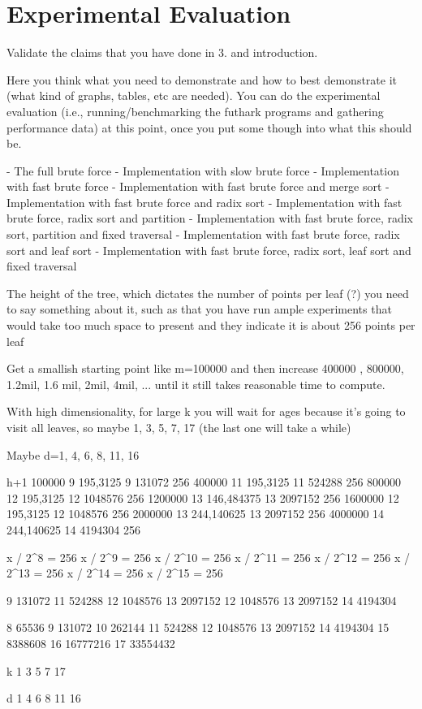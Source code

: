 \section{Experimental Evaluation}
\label{sec:eval}
Validate the claims that you have done in 3. and introduction.

Here you think what you need to demonstrate and how to best demonstrate it
(what kind of graphs, tables, etc are needed). You can do the experimental evaluation
(i.e., running/benchmarking the futhark programs and gathering performance data)
at this point, once you put some though into what this should be.


- The full brute force
- Implementation with slow brute force
- Implementation with fast brute force
- Implementation with fast brute force and merge sort
- Implementation with fast brute force and radix sort
- Implementation with fast brute force, radix sort and partition
- Implementation with fast brute force, radix sort, partition and fixed traversal
- Implementation with fast brute force, radix sort and leaf sort
- Implementation with fast brute force, radix sort, leaf sort and fixed traversal


The height of the tree, which dictates the number of points per leaf (?)  you need to say something about it, such as that you have run ample experiments that would take too much space to present and they indicate it is about 256 points per leaf


Get a smallish starting point like m=100000 and then increase 400000 , 800000, 1.2mil, 1.6 mil, 2mil, 4mil, ... until it still takes reasonable time to compute.

With high dimensionality, for large k you will wait for ages because it’s going to visit all leaves, so maybe 1, 3, 5, 7, 17 (the last one will take a while)

Maybe d=1, 4, 6, 8, 11, 16

			h+1
100000 		9		195,3125		9	131072		256
400000 		11		195,3125		11	524288		256
800000 		12		195,3125		12	1048576		256
1200000		13		146,484375		13	2097152		256
1600000		12		195,3125		12	1048576		256
2000000		13		244,140625		13	2097152		256
4000000		14		244,140625		14	4194304		256

x / 2^8 = 256
x / 2^9 = 256
x / 2^10 = 256
x / 2^11 = 256
x / 2^12 = 256
x / 2^13 = 256
x / 2^14 = 256
x / 2^15 = 256


9	131072
11	524288
12	1048576
13	2097152
12	1048576
13	2097152
14	4194304

8	65536
9	131072
10	262144
11	524288
12	1048576
13	2097152
14	4194304
15	8388608
16	16777216
17	33554432


k
1
3
5
7
17

d
1
4
6
8
11
16


